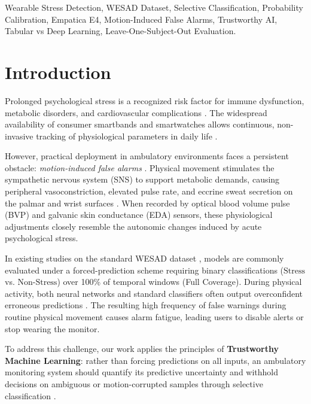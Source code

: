 \documentclass[conference]{IEEEtran}
\begin{document}
\begin{IEEEkeywords}
Wearable Stress Detection, WESAD Dataset, Selective Classification, Probability Calibration, Empatica E4, Motion-Induced False Alarms, Trustworthy AI, Tabular vs Deep Learning, Leave-One-Subject-Out Evaluation.
\end{IEEEkeywords}

\section{Introduction}
Prolonged psychological stress is a recognized risk factor for immune dysfunction, metabolic disorders, and cardiovascular complications \cite{cohen2007psychological, schneiderman2005stress, can2019stress}. The widespread availability of consumer smartbands and smartwatches allows continuous, non-invasive tracking of physiological parameters in daily life \cite{gjoreski2016continuous, schmidt2018wesad, sano2018multimodal}.

However, practical deployment in ambulatory environments faces a persistent obstacle: \textit{motion-induced false alarms} \cite{schumm2010effect, tamura2014wearable, zhang2014troika}. Physical movement stimulates the sympathetic nervous system (SNS) to support metabolic demands, causing peripheral vasoconstriction, elevated pulse rate, and eccrine sweat secretion on the palmar and wrist surfaces \cite{boucsein2012electrodermal}. When recorded by optical blood volume pulse (BVP) and galvanic skin conductance (EDA) sensors, these physiological adjustments closely resemble the autonomic changes induced by acute psychological stress.

In existing studies on the standard WESAD dataset \cite{schmidt2018wesad, siirtola2019continuous, bobade2020stress, dalmeida2021computer, behinaein2022transformer, bottcher2023detection}, models are commonly evaluated under a forced-prediction scheme requiring binary classifications ($\text{Stress}$ vs. $\text{Non-Stress}$) over 100\% of temporal windows (Full Coverage). During physical activity, both neural networks and standard classifiers often output overconfident erroneous predictions \cite{guo2017calibration}. The resulting high frequency of false warnings during routine physical movement causes alarm fatigue, leading users to disable alerts or stop wearing the monitor.

To address this challenge, our work applies the principles of \textbf{Trustworthy Machine Learning}: rather than forcing predictions on all inputs, an ambulatory monitoring system should quantify its predictive uncertainty and withhold decisions on ambiguous or motion-corrupted samples through selective classification \cite{chow1970optimum, cortes2016learning, geifman2017selective, geifman2019selectivenet, hendrickx2021machine}.
\end{document}

